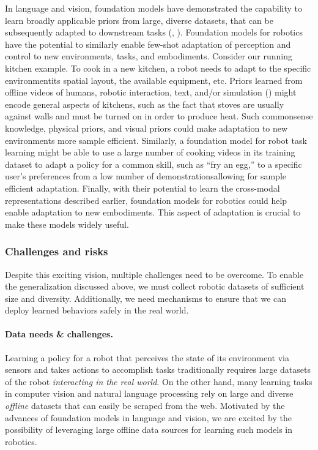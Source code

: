 In language and vision, foundation models have demonstrated the capability to learn broadly applicable priors from large, diverse datasets, that can be subsequently adapted to downstream tasks (, ). Foundation models for robotics have the potential to similarly enable few-shot adaptation of perception and control to new environments, tasks, and embodiments. Consider our running kitchen example. To cook in a new kitchen, a robot needs to adapt to the specific environment\dash{}its spatial layout, the available equipment, etc. Priors learned from offline videos of humans, robotic interaction, text, and/or simulation () might encode general aspects of kitchens, such as the fact that stoves are usually against walls and must be turned on in order to produce heat. Such commonsense knowledge, physical priors, and visual priors could make adaptation to new environments more sample efficient. Similarly, a foundation model for robot task learning might be able to use a large number of cooking videos in its training dataset to adapt a policy for a common skill, such as ``fry an egg,'' to a specific user’s preferences from a low number of demonstrations\dash{}allowing for sample efficient adaptation. Finally, with their potential to learn the cross-modal representations described earlier, foundation models for robotics could help enable adaptation to new embodiments. This aspect of adaptation is crucial to make these models widely useful.

\subsubsection{Challenges and risks}
\label{sec:robotics-challenges}

Despite this exciting vision, multiple challenges need to be overcome. To enable the generalization discussed above, we must collect robotic datasets of sufficient size and diversity. Additionally, we need mechanisms to ensure that we can deploy learned behaviors safely in the real world.

\paragraph{Data needs \& challenges.} Learning a policy for a robot that perceives the state of its environment via sensors and takes actions to accomplish tasks traditionally requires large datasets of the robot \textit{interacting in the real world}. On the other hand, many learning tasks in computer vision and natural language processing rely on large and diverse \emph{offline} datasets that can easily be scraped from the web. Motivated by the advances of foundation models in language and vision, we are excited by the possibility of leveraging large offline data sources for learning such models in robotics.


